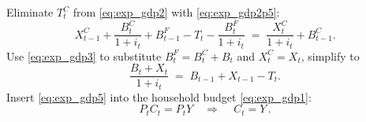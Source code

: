 \documentclass[11pt,aspectratio=169]{beamer}
\begin{document}
\begin{frame}{}
Eliminate $T_t^C$ from \eqref{eq:exp_gdp2} with \eqref{eq:exp_gdp2p5}:
\[
X_{t-1}^{C} + \frac{B_{t}^{C}}{1+i_t} + B_{t-1}^{F} - T_t - \frac{B_t^F}{1+i_t} \;=\; \frac{X_t^C}{1+i_t} + B_{t-1}^{C}.
\]
Use \eqref{eq:exp_gdp3} to substitute $B_t^F=B_t^C+B_t$ and $X_t^C=X_t$, simplify to
\begin{equation} \label{eq:exp_gdp5}
\frac{B_t + X_t}{1+i_t} \;=\; B_{t-1} + X_{t-1} - T_t.
\end{equation}
Insert \eqref{eq:exp_gdp5} into the household budget \eqref{eq:exp_gdp1}:
\[
P_t C_t = P_t Y \quad \Rightarrow \quad \, C_t = Y \, .
\]
\vspace{0.3cm}
\begin{center}
\hyperlink{market}{}
\end{center}
\end{frame}

\end{document}
